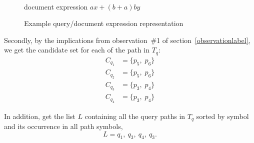 \begin{figure}
\begin{minipage}[b]{2.65in}
\begin{center}
{
} 
\\[5mm]
document expression $ax + (b+a)by$
\end{center}
\end{minipage}
\caption{Example query/document expression representation}\label{expGraph}
\end{figure}

Secondly, by the implications from observation~\#1 of section~\ref{observationlabel}, we get the candidate set for each of the path in $T_q$:
$$
\begin{aligned}
C_{q_1} &= \{ p_5,\; p_6 \} \\
C_{q_2} &= \{ p_5,\; p_6 \} \\
C_{q_3} &= \{ p_3,\; p_4 \} \\
C_{q_4} &= \{ p_3,\; p_4 \} 
\end{aligned}
$$

In addition, get the list $L$ containing all the query paths in $T_q$ sorted by symbol and its occurrence in all path symbols, 
$$
L = q_1,\ q_3,\ q_4,\ q_3.
$$

